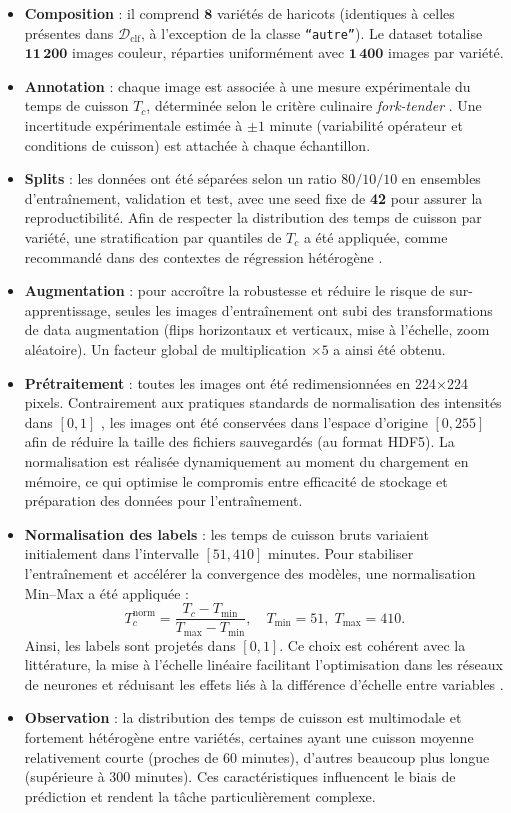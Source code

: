 \begin{itemize}
    \item \textbf{Composition} : il comprend \(\mathbf{8}\) variétés de haricots (identiques à celles présentes dans \(\mathcal{D}_{\text{clf}}\), à l’exception de la classe \texttt{``autre''}). Le dataset totalise \(\mathbf{11\,200}\) images couleur, réparties uniformément avec \(\mathbf{1\,400}\) images par variété.
    \item \textbf{Annotation} : chaque image est associée à une mesure expérimentale du temps de cuisson \(T_c\), déterminée selon le critère culinaire \emph{fork-tender} \cite{hall2017beanquality}. Une incertitude expérimentale estimée à \(\pm 1\) minute (variabilité opérateur et conditions de cuisson) est attachée à chaque échantillon.
    \item \textbf{Splits} : les données ont été séparées selon un ratio \(80/10/10\) en ensembles d’entraînement, validation et test, avec une seed fixe de \textbf{42} pour assurer la reproductibilité. Afin de respecter la distribution des temps de cuisson par variété, une stratification par quantiles de \(T_c\) a été appliquée, comme recommandé dans des contextes de régression hétérogène \cite{guyon2017analysis}.
    \item \textbf{Augmentation} : pour accroître la robustesse et réduire le risque de sur-apprentissage, seules les images d’entraînement ont subi des transformations de data augmentation (flips horizontaux et verticaux, mise à l’échelle, zoom aléatoire). Un facteur global de multiplication \(\times 5\) a ainsi été obtenu.
    \item \textbf{Prétraitement} : toutes les images ont été redimensionnées en 224×224 pixels. Contrairement aux pratiques standards de normalisation des intensités dans \([0,1]\) \cite{lecun2015deep}, les images ont été conservées dans l’espace d’origine \([0,255]\) afin de réduire la taille des fichiers sauvegardés (au format HDF5). La normalisation est réalisée dynamiquement au moment du chargement en mémoire, ce qui optimise le compromis entre efficacité de stockage et préparation des données pour l’entraînement.
    \item \textbf{Normalisation des labels} : les temps de cuisson bruts variaient initialement dans l’intervalle \([51, 410]\) minutes. Pour stabiliser l’entraînement et accélérer la convergence des modèles, une normalisation Min–Max a été appliquée :
    \[
        T_c^{\text{norm}} = \frac{T_c - T_{\min}}{T_{\max} - T_{\min}}, \quad T_{\min} = 51, \; T_{\max} = 410.
    \]
    Ainsi, les labels sont projetés dans \([0,1]\). Ce choix est cohérent avec la littérature, la mise à l’échelle linéaire facilitant l’optimisation dans les réseaux de neurones et réduisant les effets liés à la différence d’échelle entre variables \cite{bishop2006pattern}.
    \item \textbf{Observation} : la distribution des temps de cuisson est multimodale et fortement hétérogène entre variétés, certaines ayant une cuisson moyenne relativement courte (proches de 60 minutes), d’autres beaucoup plus longue (supérieure à 300 minutes). Ces caractéristiques influencent le biais de prédiction et rendent la tâche particulièrement complexe.
\end{itemize}

